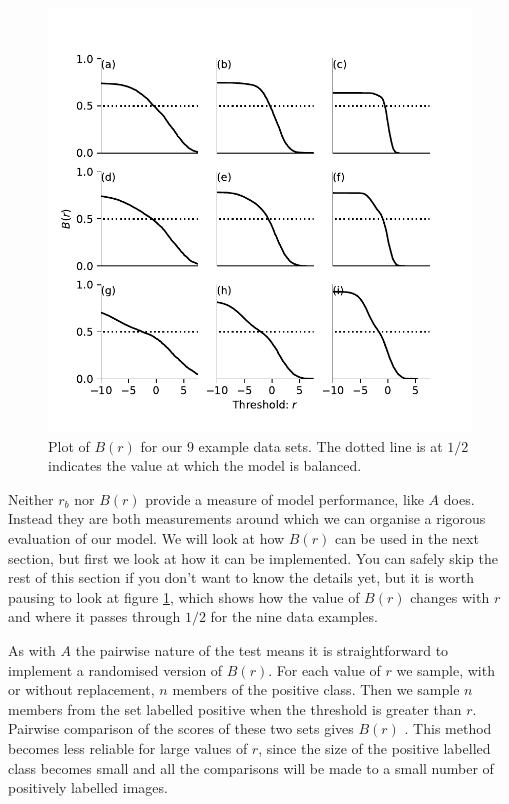 \documentclass[preprint,12pt]{article}
\begin{document}
\begin{figure}[t]
\centering
\includegraphics[scale=1]{Figures/Bplot.pdf}
\caption{Plot of $B(r)$ for our 9 example data sets. The dotted line is at $1/2$ indicates the value at which the model is balanced.}
\label{fig:Bplot}
\end{figure}

Neither $r_b$ nor $B(r)$ provide a measure of model performance, like $A$ does. Instead they are both measurements around which we can organise a rigorous evaluation of our model. We will look at how $B(r)$ can be used in the next section, but first we look at how it can be implemented. You can safely skip the rest of this section if you don't want to know the details yet, but it is worth pausing to look at figure \ref{fig:Bplot}, which shows how the value of $B(r)$ changes with $r$ and where it passes through $1/2$ for the nine data examples.

As with $A$ the pairwise nature of the test means it is straightforward to implement a randomised version of $B(r)$. For each value of $r$ we sample, with or without replacement, $n$ members of the positive class. Then we sample $n$ members from the set labelled positive when the threshold is greater than $r$. Pairwise comparison of the scores of these two sets gives $B(r)$ . This method becomes less reliable for large values of $r$, since the size of the positive labelled class becomes small and all the comparisons will be made to a small number of positively labelled images. 
\end{document}
